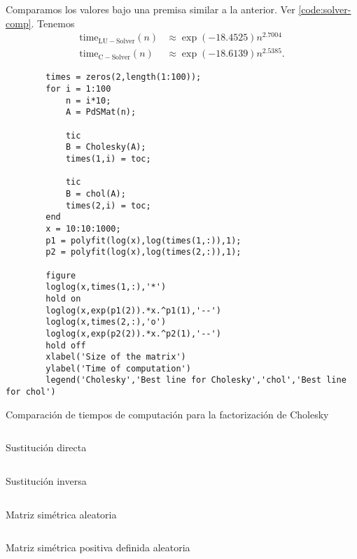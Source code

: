 Comparamos los valores bajo una premisa similar a la anterior. Ver \eqref{code:solver-comp}. Tenemos 
\begin{align*}
    \mathrm{time}_\mathrm{LU-Solver}(n) & \approx \exp(-18.4525)n^{2.7004}\\
    \mathrm{time}_\mathrm{C-Solver}(n) & \approx \exp(-18.6139)n^{2.5385}.
\end{align*}

\begin{listing}[hb!]
    \begin{verbatim}
        times = zeros(2,length(1:100));
        for i = 1:100
            n = i*10;
            A = PdSMat(n);
            
            tic
            B = Cholesky(A);
            times(1,i) = toc;
            
            tic
            B = chol(A);
            times(2,i) = toc;
        end
        x = 10:10:1000;
        p1 = polyfit(log(x),log(times(1,:)),1);
        p2 = polyfit(log(x),log(times(2,:)),1);

        figure
        loglog(x,times(1,:),'*')
        hold on
        loglog(x,exp(p1(2)).*x.^p1(1),'--')
        loglog(x,times(2,:),'o')
        loglog(x,exp(p2(2)).*x.^p2(1),'--')
        hold off
        xlabel('Size of the matrix')
        ylabel('Time of computation')
        legend('Cholesky','Best line for Cholesky','chol','Best line for chol')
    \end{verbatim}
    \caption{Comparaci\'on de tiempos de computaci\'on para la factorizaci\'on de Cholesky}
    \label{code:cholesky-comp}
\end{listing}

\begin{listing}[hb!]
    \inputminted[breaklines=true]{octave}{ForwSub.m}
    \caption{Sustituci\'on directa}
    \label{code:fs}
\end{listing}

\begin{listing}[hb!]
    \inputminted[breaklines=true]{octave}{BackSub.m}
    \caption{Sustituci\'on inversa}
    \label{code:bs}
\end{listing}

\begin{listing}[hb!]
    \inputminted[breaklines=true]{octave}{SymmetricMat.m}
    \caption{Matriz sim\'etrica aleatoria}
    \label{code:symmat}
\end{listing}

\begin{listing}[hb!]
    \inputminted[breaklines=true]{octave}{PdSMat.m}
    \caption{Matriz sim\'etrica positiva definida aleatoria}
    \label{code:pdsmat}
\end{listing}

